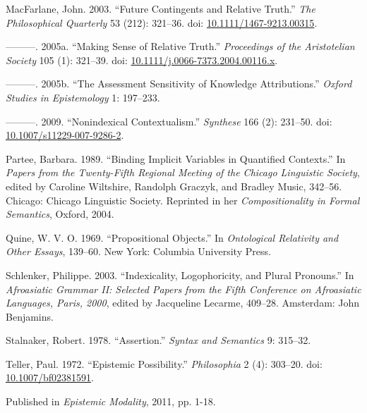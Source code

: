 \documentclass[
  11pt,
  letterpaper,
  DIV=11,
  numbers=noendperiod,
  twoside]{scrartcl}
\newlength{\cslhangindent}
\newenvironment{CSLReferences}[2] %
 {\begin{list}{}{%
  \setlength{\itemindent}{0pt}
  \setlength{\leftmargin}{0pt}
  \setlength{\parsep}{0pt}
  \ifodd #1
   \setlength{\leftmargin}{\cslhangindent}
   \setlength{\itemindent}{-1\cslhangindent}
  \fi
  \setlength{\itemsep}{#2\baselineskip}}}
 {\end{list}}
\begin{document}
\begin{CSLReferences}{1}{0}
MacFarlane, John. 2003. {``Future Contingents and Relative Truth.''}
\emph{The Philosophical Quarterly} 53 (212): 321--36. doi:
\href{https://doi.org/10.1111/1467-9213.00315}{10.1111/1467-9213.00315}.

---------. 2005a. {``{Making Sense of Relative Truth}.''}
\emph{Proceedings of the Aristotelian Society} 105 (1): 321--39. doi:
\href{https://doi.org/10.1111/j.0066-7373.2004.00116.x}{10.1111/j.0066-7373.2004.00116.x}.

---------. 2005b. {``The Assessment Sensitivity of Knowledge
Attributions.''} \emph{Oxford Studies in Epistemology} 1: 197--233.

---------. 2009. {``{Nonindexical Contextualism}.''} \emph{Synthese} 166
(2): 231--50. doi:
\href{https://doi.org/10.1007/s11229-007-9286-2}{10.1007/s11229-007-9286-2}.

Partee, Barbara. 1989. {``Binding Implicit Variables in Quantified
Contexts.''} In \emph{Papers from the Twenty-Fifth Regional Meeting of
the Chicago Linguistic Society}, edited by Caroline Wiltshire, Randolph
Graczyk, and Bradley Music, 342--56. Chicago: Chicago Linguistic
Society. Reprinted in her \emph{Compositionality in Formal Semantics},
Oxford, 2004.

Quine, W. V. O. 1969. {``Propositional Objects.''} In \emph{Ontological
Relativity and Other Essays}, 139--60. New York: Columbia University
Press.

Schlenker, Philippe. 2003. {``Indexicality, Logophoricity, and Plural
Pronouns.''} In \emph{Afroasiatic Grammar II: Selected Papers from the
Fifth Conference on Afroasiatic Languages, Paris, 2000}, edited by
Jacqueline Lecarme, 409--28. Amsterdam: John Benjamins.

Stalnaker, Robert. 1978. {``Assertion.''} \emph{Syntax and Semantics} 9:
315--32.

Teller, Paul. 1972. {``Epistemic Possibility.''} \emph{Philosophia} 2
(4): 303--20. doi:
\href{https://doi.org/10.1007/bf02381591}{10.1007/bf02381591}.

\end{CSLReferences}



\noindent Published in\emph{
Epistemic Modality}, 2011, pp. 1-18.
\end{document}
